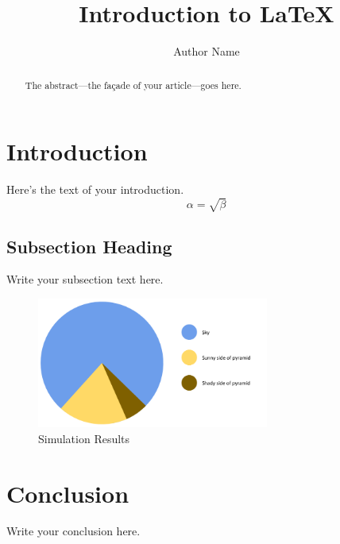 \documentclass{article}
\begin{document}
\title{Introduction to \LaTeX{}}
\author{Author Name}
\maketitle
\tableofcontents
\begin{abstract}
The abstract---the façade of your article---goes here.
\end{abstract}
\section{Introduction}
Here's the text of your introduction.
\begin{equation}
  \label{simple_equation}
  \alpha = \sqrt{ \beta }
\end{equation}
\subsection{Subsection Heading}
Write your subsection text here.
\begin{figure}
  \centering
  \includegraphics[width=3.0in]{images/figure}
  \caption{Simulation Results}
  \label{simulation_figure}
\end{figure}
\section{Conclusion}
Write your conclusion here.
\end{document}

